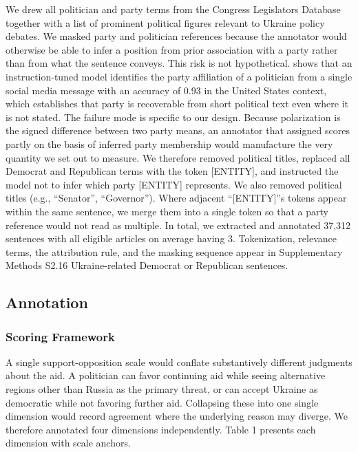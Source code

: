 We drew all politician and party terms from the Congress Legislators Database \citep{UnitedstatesCongresslegislators2025} together with a list of prominent political figures relevant to Ukraine policy debates. We masked party and politician references because the annotator would otherwise be able to infer a position from prior association with a party rather than from what the sentence conveys. This risk is not hypothetical. \citet{tornbergLargeLanguageModels2025} shows that an instruction-tuned model identifies the party affiliation of a politician from a single social media message with an accuracy of 0.93 in the United States context, which establishes that party is recoverable from short political text even where it is not stated. The failure mode is specific to our design. Because polarization is the signed difference between two party means, an annotator that assigned scores partly on the basis of inferred party membership would manufacture the very quantity we set out to measure. We therefore removed political titles, replaced all Democrat and Republican terms with the token [ENTITY], and instructed the model not to infer which party [ENTITY] represents. We also removed political titles (e.g., ``Senator'', ``Governor''). Where adjacent ``[ENTITY]''s tokens appear within the same sentence, we merge them into a single token so that a party reference would not read as multiple. In total, we extracted and annotated 37,312 sentences with all eligible articles on average having 3. Tokenization, relevance terms, the attribution rule, and the masking sequence appear in Supplementary Methods S2.16 Ukraine-related Democrat or Republican sentences.

\subsection{Annotation}

\subsubsection{Scoring Framework}

A single support-opposition scale would conflate substantively different judgments about the aid. A politician can favor continuing aid while seeing alternative regions other than Russia as the primary threat, or can accept Ukraine as democratic while not favoring further aid. Collapsing these into one single dimension would record agreement where the underlying reason may diverge. We therefore annotated four dimensions independently. Table 1 presents each dimension with scale anchors.



